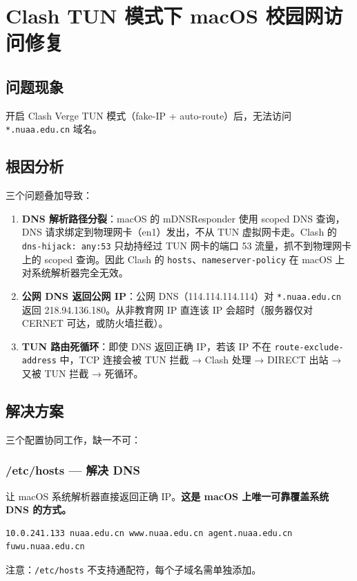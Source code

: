 \section{Clash TUN 模式下 macOS 校园网访问修复}

\subsection{问题现象}
开启 Clash Verge TUN 模式（fake-IP + auto-route）后，无法访问 \verb|*.nuaa.edu.cn| 域名。

\subsection{根因分析}
三个问题叠加导致：

\begin{enumerate}
  \item \textbf{DNS 解析路径分裂}：macOS 的 mDNSResponder 使用 scoped DNS 查询，DNS 请求绑定到物理网卡（en1）发出，不从 TUN 虚拟网卡走。Clash 的 \verb|dns-hijack: any:53| 只劫持经过 TUN 网卡的端口 53 流量，抓不到物理网卡上的 scoped 查询。因此 Clash 的 \verb|hosts|、\verb|nameserver-policy| 在 macOS 上对系统解析器完全无效。

  \item \textbf{公网 DNS 返回公网 IP}：公网 DNS（114.114.114.114）对 \verb|*.nuaa.edu.cn| 返回 218.94.136.180。从非教育网 IP 直连该 IP 会超时（服务器仅对 CERNET 可达，或防火墙拦截）。

  \item \textbf{TUN 路由死循环}：即使 DNS 返回正确 IP，若该 IP 不在 \verb|route-exclude-address| 中，TCP 连接会被 TUN 拦截 → Clash 处理 → DIRECT 出站 → 又被 TUN 拦截 → 死循环。
\end{enumerate}

\subsection{解决方案}
三个配置协同工作，缺一不可：

\subsubsection{/etc/hosts — 解决 DNS}
让 macOS 系统解析器直接返回正确 IP。\textbf{这是 macOS 上唯一可靠覆盖系统 DNS 的方式。}
\begin{verbatim}
10.0.241.133 nuaa.edu.cn www.nuaa.edu.cn agent.nuaa.edu.cn fuwu.nuaa.edu.cn
\end{verbatim}
注意：\verb|/etc/hosts| 不支持通配符，每个子域名需单独添加。

